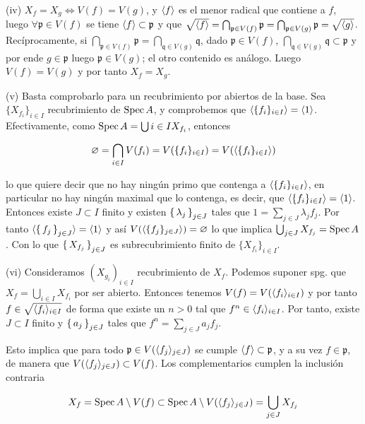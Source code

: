 \documentclass[../main.tex]{subfiles}
\begin{document}
(iv) $X_f = X_g \iff V(f) = V(g)$, y $\langle f \rangle$ es el menor radical que contiene a $f$, luego $\forall \mathfrak p \in V(f)$ se tiene $\langle f \rangle \subset \mathfrak p$ y que $\sqrt{\langle f \rangle} = \bigcap_{\mathfrak p \in V(f)} \mathfrak p = \bigcap_{\mathfrak p \in V(g)} \mathfrak{p} = \sqrt{\langle g \rangle}$.
Recíprocamente, si $\bigcap_{\mathfrak p \in V(f)} \mathfrak p = \bigcap_{\mathfrak q \in V(g)} \mathfrak{q}$, dado $\mathfrak p \in V(f)$, $ \bigcap_{\mathfrak{q} \in V(g)} \mathfrak{q} \subset \mathfrak{p}$ y por ende $g \in \mathfrak p$ luego $\mathfrak p \in V(g)$; el otro contenido es análogo. Luego $V(f) = V(g)$ y por tanto $X_f = X_g$.

(v) Basta comprobarlo para un recubrimiento por abiertos de la base. Sea $\{X_{f_i}\}_{i\in I}$ recubrimiento de $\operatorname{Spec} A$, y comprobemos que $\langle \{f_i\}_{i\in I} \rangle = \langle 1 \rangle$. Efectivamente, como $\operatorname{Spec} A = \bigcup{i\in I}X_{f_i} $, entonces

\begin{equation}
  \varnothing = \bigcap_{i\in I} V(f_i) = V(\{f_i\}_{i\in I}) = V(\langle \{f_i\}_{i\in I} \rangle)
\end{equation}

lo que quiere decir que no hay ningún primo que contenga a $\langle \{f_i\}_{i\in I} \rangle$, en particular no hay ningún maximal que lo contenga, es decir, que $\langle \{f_i\}_{i\in I} \rangle = \langle 1 \rangle$. Entonces existe $J\subset I$ finito y existen $\set{\lambda_j}_{j\in J}$ tales que $1 = \sum_{j\in J} \lambda_j f_j$.
Por tanto $\langle  \set{f_j}_{j\in J} \rangle = \langle  1 \rangle$ y así  $V(\langle \{f_j\}_{j\in J} \rangle )= \varnothing$ lo que implica $\bigcup_{j\in J} X_{f_j} = \operatorname{Spec} A$. Con lo que $\set{X_{f_j}}_{j\in J}$ es subrecubrimiento finito de $\{X_{f_i}\}_{i\in I}$.

(vi) Consideramos $(X_{g_i})_{i\in I}$ recubrimiento de $X_f$. Podemos suponer spg. que $X_f = \bigcup_{i\in I} X_{f_i}$ por ser abierto. Entonces tenemos $V(f) = V(\langle f_i \rangle_{i\in I})$ y por tanto $f\in \sqrt{\langle f_i \rangle_{i\in I}}$ de forma que existe un $n>0$ tal que $f^n \in \langle f_i \rangle_{i\in I}$.
Por tanto, existe $J\subset I$ finito y $\set{a_j}_{j\in J}$ tales que $f^n = \sum_{j\in J}a_j f_j$.

Esto implica que para todo $\mathfrak p \in  V(\langle f_j \rangle_{j\in J})$ se cumple $\langle f \rangle \subset \mathfrak p$, y a su vez $f \in \mathfrak p$, de manera que $ V(\langle f_j \rangle_{j\in J}) \subset V(f)$. Los complementarios cumplen la inclusión contraria

\[ X_f = \operatorname{Spec} A \setminus V(f) \subset \operatorname{Spec} A \setminus V(\langle f_j \rangle_{j\in J}) = \bigcup_{j\in J} X_{f_j} \]
\end{document}
